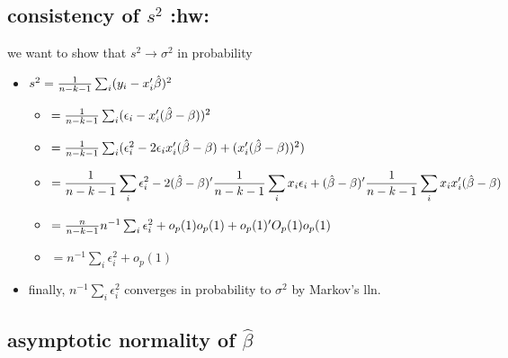 \documentclass[11pt]{article}
\begin{document}
\subsection{consistency of $s^2$ \textbf{:hw:}}
\label{sec-2-3}

     we want to show that $s^2 \to \sigma^2$ in probability
\begin{itemize}
\item $s^2 = {1 \over n - k - 1} \sum_i (y_i - x_i'\hat\beta)^2$
\begin{itemize}
\item $= {1 \over n - k - 1} \sum_i (\epsilon_i - x_i'(\hat\beta-\beta))^2$
\item $= {1 \over n - k - 1} \sum_i (\epsilon_i^2 - 2 \epsilon_i
         x_i'(\hat\beta-\beta) + (x_i'(\hat\beta-\beta))^2)$
\item \[= {1 \over n - k - 1} \sum_i \epsilon_i^2 - 2 (\hat\beta -
         \beta)' {1 \over n - k - 1} \sum_i  x_i \epsilon_i +
         (\hat\beta - \beta)' {1 \over n - k - 1} \sum_i x_i x_i'
         (\hat\beta - \beta)\]
\item $=  {n \over n - k - 1} n^{-1} \sum_i \epsilon_i^2 + o_p(1)
         o_p(1) + o_p(1)'O_p(1)o_p(1)$
\item $= n^{-1} \sum_i \epsilon_i^2 + o_p(1)$
\end{itemize}
\item finally, $n^{-1} \sum_i \epsilon_i^2$ converges in probability
       to $\sigma^2$ by Markov's lln.
\end{itemize}
\subsection{asymptotic normality of $\hat\beta$}
\label{sec-2-4}
\end{document}
